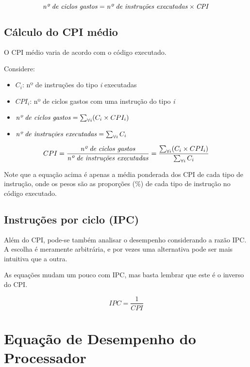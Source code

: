 \documentclass[12pt]{article}
\newcommand{\Text}[1]{\textrm{\textit{#1}}}
\begin{document}
\begin{equation} \label{eq:numciclosclock}
  \Text{nº de ciclos gastos} = \Text{nº de instruções executadas} \times \Text{CPI}
\end{equation}


\subsection{Cálculo do CPI médio}

\begin{tcolorbox}[title=Lembre-se]
  O CPI médio varia de acordo com o código executado.
\end{tcolorbox}

Considere:
\begin{itemize}
  \item \( C_i \): nº de instruções do tipo \emph{i} executadas
  \item \( CPI_i \): nº de ciclos gastos com uma instrução do tipo \emph{i}
  \item \( \Text{nº de ciclos gastos} = \sum_{\forall i} (C_i \times CPI_i) \)
  \item \( \Text{nº de instruções executadas} = \sum_{\forall i} C_i \)
\end{itemize}

\[
  CPI = \frac{\Text{nº de ciclos gastos}}{\Text{nº de instruções executadas}}
  = \frac{\sum_{\forall i} (C_i \times CPI_i)}{\sum_{\forall i} C_i}
\]

Note que a equação acima é apenas a média ponderada dos CPI de cada tipo de instrução, onde os pesos são as proporções (\%) de cada tipo de instrução no código executado.


\subsection{Instruções por ciclo (IPC)}

Além do CPI, pode-se também analisar o desempenho considerando a razão IPC. A escolha é meramente arbitrária, e por vezes uma alternativa pode ser mais intuitiva que a outra.

As equações mudam um pouco com IPC, mas basta lembrar que este é o inverso do CPI.

\[ IPC = \frac{1}{CPI} \]


\section{Equação de Desempenho do Processador}
\end{document}
